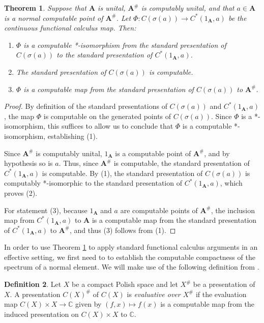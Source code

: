 \documentclass{amsart}
\newcommand{\boldA}{\mathbf{A}}
\theoremstyle{plain}
\newtheorem{theorem}{Theorem}[section]
\theoremstyle{definition}
\newtheorem{definition}[theorem]{Definition}
\numberwithin{equation}{section}
\begin{document}
\begin{theorem}\label{theorem:CompFuncCalc}
Suppose that $\boldA$ is unital, $\boldA^\#$ is computably unital, and that $a \in \boldA$ is a normal computable point of $\boldA^\#$.  Let $\Phi : C(\sigma(a)) \to C^*(1_\boldA, a)$ be the continuous functional calculus map.  Then:
\begin{enumerate}
\item{$\Phi$ is a computable *-isomorphism from the standard presentation of $C(\sigma(a))$ to the standard presentation of $C^*(1_\boldA, a)$.}
\item{The standard presentation of $C(\sigma(a))$ is computable.}
\item{$\Phi$ is a computable map from the standard presentation of $C(\sigma(a))$ to $\boldA^\#$.}
\end{enumerate}
\end{theorem}
\begin{proof}
By definition of the standard presentations of $C(\sigma(a))$ and $C^*(1_\boldA, a)$, the map $\Phi$ is computable on the generated points of $C(\sigma(a))$.  Since $\Phi$ is a *-isomorphism, this suffices to allow us to conclude that $\Phi$ is a computable *-isomorphism, establishing (1).

Since $\boldA^\#$ is computably unital, $1_\boldA$ is a computable point of $\boldA^\#$, and by hypothesis so is $a$.  Thus, since $\boldA^\#$ is computable, the standard presentation of $C^*(1_\boldA, a)$ is computable.  By (1), the standard presentation of $C(\sigma(a))$ is computably *-isomorphic to the standard presentation of $C^*(1_\boldA, a)$, which proves (2).

For statement (3), because $1_\boldA$ and $a$ are computable points of $\boldA^\#$, the inclusion map from $C^*(1_\boldA, a)$ to $\boldA$ is a computable map from the standard presentation of $C^*(1_\boldA, a)$ to $\boldA^\#$, and thus (3) follows from (1).
\end{proof}

In order to use Theorem \ref{theorem:CompFuncCalc} to apply standard functional calculus arguments in an effective setting, we first need to to establish the computable compactness of the spectrum of a normal element.  We will make use of the following definition from \cite{McNicholl.2025}.

\begin{definition}
Let $X$ be a compact Polish space and let $X^\#$ be a presentation of $X$.  A presentation $C(X)^\#$ of $C(X)$ is \emph{evaluative over $X^\#$} if the evaluation map $C(X) \times X \to \mathbb{C}$ given by $(f,x) \mapsto f(x)$ is a computable map from the induced presentation on $C(X) \times X$ to $\mathbb{C}$.
\end{definition}
\end{document}
